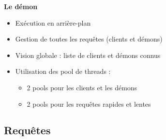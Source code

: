 \documentclass{beamer}
\begin{document}
\begin{frame}
    \textbf{Le démon}
    
    \begin{itemize}
        \item Exécution en arrière-plan
        \item Gestion de toutes les requêtes (clients et démons)
        \item Vision globale : liste de clients et démons connus
        \item Utilisation des pool de threads :
            \begin{itemize}
        \item 2 pools pour les clients et les démons
        \item 2 pools pour les requêtes rapides et lentes
            \end{itemize}
    \end{itemize}
\end{frame}

\begin{frame}
    \section{Requêtes}
\end{frame}
\end{document}
